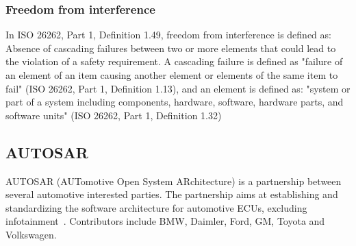 \subsubsection{Freedom from interference}
In ISO 26262, Part 1, Definition 1.49, freedom from interference is defined as: Absence of cascading failures between two or more elements that could lead to the violation of a safety requirement. A cascading failure is defined as "failure of an element of an item causing another element or elements of the same item to fail" (ISO 26262, Part 1, Definition 1.13), and an element is defined as: "system or part of a system including components, hardware, software, hardware parts, and software units" (ISO 26262, Part 1, Definition 1.32)

\subsection{AUTOSAR}
AUTOSAR (AUTomotive Open System ARchitecture) is a partnership between several automotive interested parties. The partnership aims at establishing and standardizing the software architecture for automotive ECUs, excluding infotainment~\cite{website:autosar}. Contributors include BMW, Daimler, Ford, GM, Toyota and Volkswagen.



